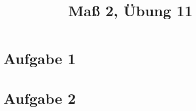\documentclass[]{article}
\author{}
\title{Maß 2, Übung 11}
\begin{document}
    \begin{titlepage}
        \maketitle
    \end{titlepage}
    
    \section{Aufgabe 1}
    
    \section{Aufgabe 2}
    
    
    
\end{document}
